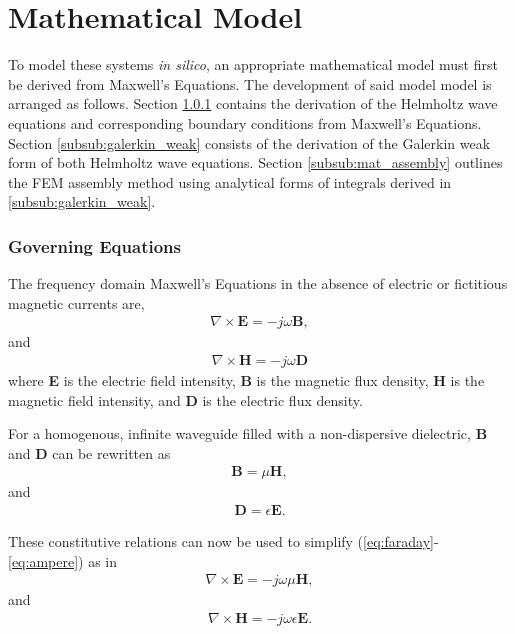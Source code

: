 \section{Mathematical Model}
\label{sec:mathmod}

To model these systems \textit{in silico}, an appropriate mathematical model must first be derived from Maxwell's Equations. The development of said model model is arranged as follows. Section \ref{subsub:goveq} contains the derivation of the Helmholtz wave equations and corresponding boundary conditions from Maxwell's Equations. Section \ref{subsub:galerkin_weak} consists of the derivation of the Galerkin weak form of both Helmholtz wave equations. Section \ref{subsub:mat_assembly} outlines the FEM assembly method using analytical forms of integrals derived in \ref{subsub:galerkin_weak}.

\subsubsection{Governing Equations}
\label{subsub:goveq}

The frequency domain Maxwell's Equations in the absence of electric or fictitious magnetic currents are,
\begin{align}
	\nabla \times \textbf{E} = -j\omega\textbf{B},
	\label{eq:faraday}
\end{align}
and
\begin{align}
	\nabla \times \textbf{H} = -j\omega\textbf{D}
	\label{eq:ampere}
\end{align}
where \textbf{E} is the electric field intensity, \textbf{B} is the magnetic flux density, \textbf{H} is the magnetic field intensity, and \textbf{D} is the electric flux density.

For a homogenous, infinite waveguide filled with a non-dispersive dielectric, \textbf{B} and \textbf{D} can be rewritten as
\begin{align}
	\textbf{B} = \mu \textbf{H},
	\label{eq:corH}
\end{align}
and
\begin{align}
	\textbf{D} = \epsilon \textbf{E}.
	\label{eq:corE}
\end{align}

These constitutive relations can now be used to simplify (\ref{eq:faraday}-\ref{eq:ampere}) as in 
\begin{align}
	\nabla \times \textbf{E} = -j\omega\mu\textbf{H},
	\label{eq:faraday_reduced}
\end{align}
and
\begin{align}
	\nabla \times \textbf{H} = -j\omega\epsilon\textbf{E}.
	\label{eq:ampere_reduced}
\end{align}

